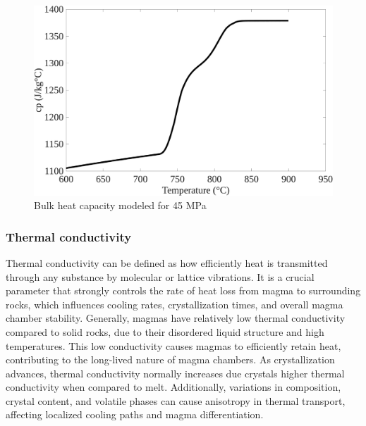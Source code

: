 \begin{figure}[H]
    \centering
    \includegraphics[width=1\linewidth]{img/chapter2/properties/heat_capacity/SMOOTHED_cp.png}
    \caption{Bulk heat capacity modeled for 45 MPa}
    \label{fig:enter-label}
\end{figure}

\subsubsection{Thermal conductivity}
Thermal conductivity can be defined as how efficiently heat is transmitted through any substance by molecular or lattice vibrations. It is a crucial parameter that strongly controls the rate of heat loss from magma to surrounding rocks, which influences cooling rates, crystallization times, and overall magma chamber stability. Generally, magmas have relatively low thermal conductivity compared to solid rocks, due to their disordered liquid structure and high temperatures. This low conductivity causes magmas to efficiently retain heat, contributing to the long-lived nature of magma chambers. As crystallization advances, thermal conductivity normally increases due crystals higher thermal conductivity when compared to melt. Additionally, variations in composition, crystal content, and volatile phases can cause anisotropy in thermal transport, affecting localized cooling paths and magma differentiation.

